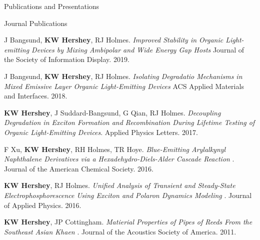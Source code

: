\documentclass{resume} %
\begin{document}

\begin{rSection}{Publications and Presentations}
\begin{rSubsection}{Journal Publications}{}{}{}
\item J Bangsund, \textbf{KW Hershey}, RJ Holmes. {\em Improved Stability in Organic Light-emitting Devices by Mixing Ambipolar and Wide Energy Gap Hosts} Journal of the Society of Information Display. 2019.
\item J Bangsund, \textbf{KW Hershey}, RJ Holmes. {\em Isolating Degradatio Mechanisms in Mixed Emissive Layer Organic Light-Emitting Devices} ACS Applied Materials and Interfaces. 2018.
\item  \textbf{KW Hershey}, J Suddard-Bangsund, G Qian, RJ Holmes. {\em Decoupling Degradation in Exciton Formation and Recombination During Lifetime Testing of Organic Light-Emitting Devices}. Applied Physics Letters. 2017.
\item F Xu, \textbf{KW Hershey}, RH Holmes, TR Hoye. {\em Blue-Emitting Arylalkynyl Naphthalene Derivatives via a Hexadehydro-Diels-Alder Cascade Reaction} . Journal of the American Chemical Society. 2016.
\item \textbf{KW Hershey}, RJ Holmes. {\em Unified Analysis of Transient and Steady-State Electrophosphorescence Using Exciton and Polaron Dynamics Modeling} . Journal of Applied Physics. 2016.
\item \textbf{KW Hershey}, JP Cottingham. {\em Matierial Properties of Pipes of Reeds From the Southeast Asian Khaen} . Journal of the Acoustics Society of America. 2011.

\end{rSubsection}



\end{rSection}
\end{document}

